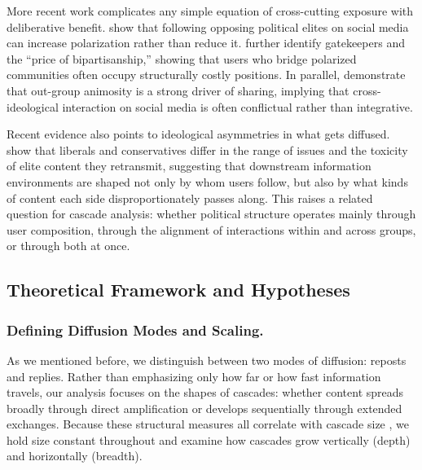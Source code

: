 \documentclass[letterpaper]{article} %
\begin{document}
More recent work complicates any simple equation of cross-cutting exposure with deliberative benefit. \citet{bail_exposure_2018} show that following opposing political elites on social media can increase polarization rather than reduce it. \citet{garimella_political_2018} further identify gatekeepers and the ``price of bipartisanship,'' showing that users who bridge polarized communities often occupy structurally costly positions. In parallel, \citet{rathje_outgroup_2021} demonstrate that out-group animosity is a strong driver of sharing, implying that cross-ideological interaction on social media is often conflictual rather than integrative.

Recent evidence also points to ideological asymmetries in what gets diffused. \citet{chang_share_2025} show that liberals and conservatives differ in the range of issues and the toxicity of elite content they retransmit, suggesting that downstream information environments are shaped not only by whom users follow, but also by what kinds of content each side disproportionately passes along. This raises a related question for cascade analysis: whether political structure operates mainly through user composition, through the alignment of interactions within and across groups, or through both at once.


\subsection{Theoretical Framework and Hypotheses}

\subsubsection{Defining Diffusion Modes and Scaling.}
As we mentioned before, we distinguish between two modes of diffusion: reposts and replies. Rather than emphasizing only how far or how fast information travels, our analysis focuses on the shapes of cascades: whether content spreads broadly through direct amplification or develops sequentially through extended exchanges. Because these structural measures all correlate with cascade size \cite{juul_comparing_2021}, we hold size constant throughout and examine how cascades grow vertically (depth) and horizontally (breadth).
\end{document}
